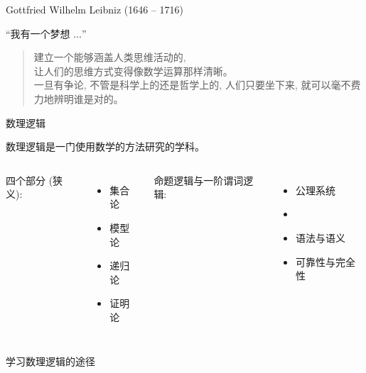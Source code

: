 \begin{frame}{Gottfried Wilhelm Leibniz (1646 -- 1716)}
\end{frame}

\begin{frame}{``我有一个梦想 $\ldots$''}
  \begin{quote}
    建立一个能够涵盖人类思维活动的,\\
    让人们的思维方式变得像数学运算那样清晰。\\[8pt]

    一旦有争论, 不管是科学上的还是哲学上的,
    人们只要坐下来,
    就可以毫不费力地辨明谁是对的。
  \end{quote}

  \vspace{0.80cm}
  \begin{quote}
    \centerline{}
  \end{quote}
\end{frame}

\begin{frame}{数理逻辑}
  \centerline{数理逻辑是一门使用数学的方法研究的学科。}
  \vspace{0.80cm}

  \begin{columns}
    四个部分 (狭义):
      \begin{itemize}
	\item 集合论
	\item 模型论
	\item 递归论
	\item 证明论
      \end{itemize}
    命题逻辑与一阶谓词逻辑:
      \begin{itemize}
	\item 公理系统
	\item {}
	\item 语法与语义
	\item 可靠性与完全性
      \end{itemize}
  \end{columns}
\end{frame}

\begin{frame}{学习数理逻辑的途径}
  \begin{columns}
  \end{columns}
\end{frame}

